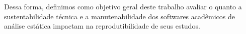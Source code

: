 %
%
%
%
%
%
%
%
%
%
%
%
%
%
%
%

Dessa forma, definimos como objetivo geral deste trabalho avaliar o quanto a
sustentabilidade técnica e a manutenabilidade dos softwares acadêmicos de
análise estática impactam na reprodutibilidade de seus estudos.

